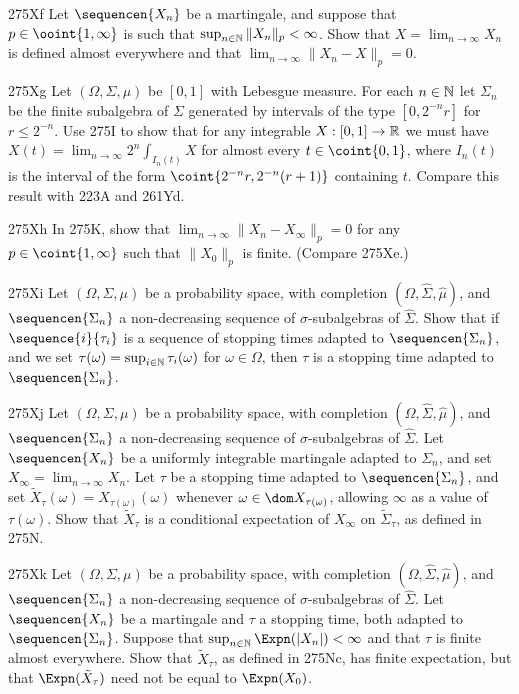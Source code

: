 {\spheader 275Xf Let $\sequencen{X_n}$ be a martingale, and
suppose that $p\in\ooint{1,\infty}$ is such that
$\sup_{n\in\Bbb N}\|X_n\|_p<\infty$.   Show that
$X=\lim_{n\to\infty}X_n$ is defined almost everywhere and that
$\lim_{n\to\infty}\|X_n-X\|_p=0$.

\sqheader 275Xg Let $(\Omega,\Sigma,\mu)$ be $[0,1]$ with
Lebesgue measure.   For each $n\in\Bbb N$ let $\Sigma_n$ be the finite
subalgebra of $\Sigma$ generated by intervals of the type $[0,2^{-n}r]$
for $r\le 2^{-n}$.   Use 275I to show that for any integrable
$X:[0,1]\to\Bbb R$ we must have
$X(t)=\lim_{n\to\infty}2^n\int_{I_n(t)}X$ for almost every
$t\in\coint{0,1}$, where $I_n(t)$ is
the interval of the form $\coint{2^{-n}r,2^{-n}(r+1)}$ containing $t$.
Compare this result with 223A and 261Yd.

\spheader 275Xh In 275K, show that
$\lim_{n\to\infty}\|X_n-X_{\infty}\|_p=0$ for any $p\in\coint{1,\infty}$
such that $\|X_0\|_p$ is finite.   (Compare 275Xe.)

\spheader 275Xi Let $(\Omega,\Sigma,\mu)$ be a probability
space, with completion $(\Omega,\hat\Sigma,\hat\mu)$, and
$\sequencen{\Sigma_n}$ a non-decreasing sequence of
$\sigma$-subalgebras of $\hat\Sigma$.   Show that if $\sequence{i}{\tau_i}$
is a sequence of stopping times adapted to $\sequencen{\Sigma_n}$, and we
set $\tau(\omega)=\sup_{i\in\Bbb N}\tau_i(\omega)$ for $\omega\in\Omega$,
then $\tau$ is a stopping time adapted to $\sequencen{\Sigma_n}$.

\spheader 275Xj Let $(\Omega,\Sigma,\mu)$ be a probability
space, with completion $(\Omega,\hat\Sigma,\hat\mu)$, and
$\sequencen{\Sigma_n}$ a non-decreasing sequence of
$\sigma$-subalgebras of $\hat\Sigma$.   Let $\sequencen{X_n}$ be a
uniformly integrable martingale adapted to $\Sigma_n$, and set
$X_{\infty}=\lim_{n\to\infty}X_n$.   Let $\tau$ be a stopping time
adapted to $\sequencen{\Sigma_n}$, and set
$\tilde X_{\tau}(\omega)=X_{\tau(\omega)}(\omega)$ whenever
$\omega\in\dom X_{\tau(\omega)}$,
allowing $\infty$ as a value of $\tau(\omega)$.   Show that
$\tilde X_{\tau}$
is a conditional expectation of $X_{\infty}$ on $\tilde\Sigma_{\tau}$,
as defined in 275N.

\spheader 275Xk Let $(\Omega,\Sigma,\mu)$ be a probability
space, with completion $(\Omega,\hat\Sigma,\hat\mu)$, and
$\sequencen{\Sigma_n}$ a non-decreasing sequence of
$\sigma$-subalgebras of $\hat\Sigma$.   Let $\sequencen{X_n}$ be a
martingale and $\tau$ a stopping time, both adapted to
$\sequencen{\Sigma_n}$.   Suppose that
$\sup_{n\in\Bbb N}\Expn(|X_n|)<\infty$ and that $\tau$ is finite almost
everywhere.
Show that $\tilde X_{\tau}$, as defined in 275Nc, has finite
expectation, but
that $\Expn(\tilde X_{\tau})$ need not be equal to $\Expn(X_0)$.

}
